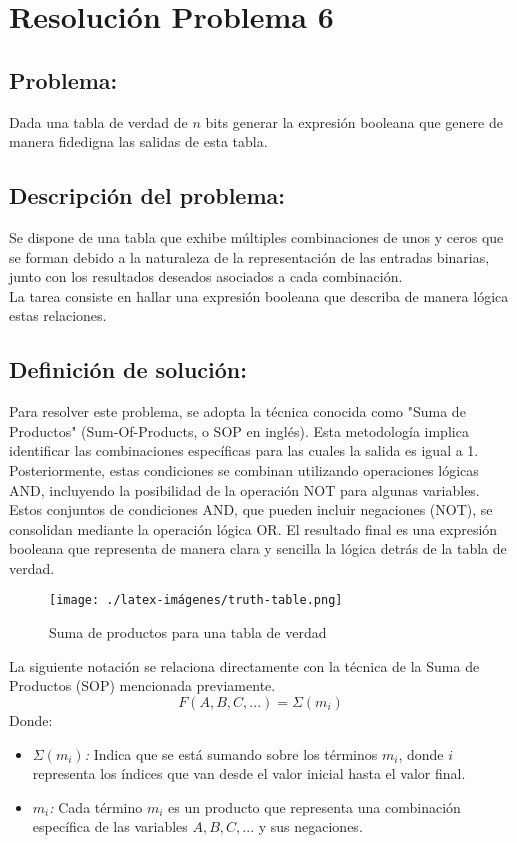 \section{Resolución Problema 6}
\subsection{Problema:}
Dada una tabla de verdad de $n$ bits generar la expresión booleana que genere de manera fidedigna las salidas de esta tabla.

\subsection{\textbf{Descripción del problema:}}
Se dispone de una tabla que exhibe múltiples combinaciones de unos y ceros que se forman debido a la naturaleza de la representación de las entradas binarias, junto con los resultados deseados asociados a cada combinación. \\
La tarea consiste en hallar una expresión booleana que describa de manera lógica estas relaciones.


\subsection{\textbf{Definición de solución:}}
Para resolver este problema, se adopta la técnica conocida como "Suma de Productos" (Sum-Of-Products, o SOP en inglés). Esta metodología implica identificar las combinaciones específicas para las cuales la salida es igual a 1. Posteriormente, estas condiciones se combinan utilizando operaciones lógicas AND, incluyendo la posibilidad de la operación NOT para algunas variables. \\
Estos conjuntos de condiciones AND, que pueden incluir negaciones (NOT), se consolidan mediante la operación lógica OR. El resultado final es una expresión booleana que representa de manera clara y sencilla la lógica detrás de la tabla de verdad.\\ 

\begin{figure}[h!]
    \centering
    \texttt{[image: ./latex-imágenes/truth-table.png]}
    \caption{Suma de productos para una tabla de verdad}
    \label{fig:enter-label}
\end{figure}
La siguiente notación se relaciona directamente con la técnica de la Suma de Productos (SOP) mencionada previamente.\\
\[ F(A, B, C, ...) = \Sigma(m_i) \]
Donde:
\begin{itemize}

  \item[{\ieeeguilsinglright}] {\it \(\Sigma(m_i)\):} Indica que se está sumando sobre los términos \(m_i\), donde \(i\) representa los índices que van desde el valor inicial hasta el valor final.

  \item[{\ieeeguilsinglright}] {\it \(m_i\):} Cada término \(m_i\) es un producto que representa una combinación específica de las variables \(A, B, C, ...\) y sus negaciones.
\end{itemize}

